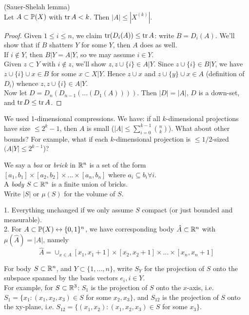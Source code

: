 \documentclass[a4paper]{article}
\begin{document}
\begin{thm} (Sauer-Shelah lemma)\\
    Let $A \subset \P(X)$ with $\tr A < k$. Then $|A| \leq |X^{(k)}|$.
    \begin{proof}
        Given $1 \leq i \leq n$, we claim $\tr(D_i(A)) \leq \tr A$: write $B=D_i(A)$. We'll show that if $B$ shatters $Y$ for some $Y$, then $A$ does as well.\\
        If $i \not\in Y$, then $B|Y = A|Y$, so we may assume $i \in Y$.\\
        Given $z \subset Y$ with $i \not\in z$, we'll show $z, z\cup\{i\} \in A|Y$. Since $z \cup \{i\} \in B|Y$, we have $z \cup \{i\} \cup x \in B$ for some $x \subset X|Y$. Hence $z \cup x$ and $z \cup \{y\} \cup x \in A$ (definition of $D_i$) whence $z,z\cup \{i\} \in A|Y$.\\
        Now let $D=D_n(D_{n-1}(...(D_1(A))))$. Then $|D|=|A|$, $D$ is a down-set, and $\tr D \leq \tr A$.
    \end{proof}
\end{thm}

\begin{rem}
    We used 1-dimensional compressions. We have: if all $k$-dimensional projections have size $\leq 2^k-1$, then $A$ is small ($|A| \leq \sum_{i=0}^{k-1} {n \choose k}$). What about other bounds? For example, what if each $k$-dimensional projection is $\leq 1/2$-sized $(A|Y| \leq 2^{k-1}$)?
\end{rem}

We say a \emph{box} or \emph{brick} in $\R^n$ is a set of the form $[a_1,b_1] \times [a_2,b_2] \times ... \times [a_n, b_n]$ where $a_i \subseteq b_i \forall i$.\\
A \emph{body} $S \subset \R^n$ is a finite union of bricks.\\
Write $|S|$ or $\mu(S)$ for the volume of $S$.

\begin{rem}
    1. Everything unchanged if we only assume $S$ compact (or just bounded and measurable).\\
    2. For $A \subset \P(X) \leftrightarrow \{0,1\}^n$, we have corresponding body $\hat{A} \subset \R^n$ with $\mu(\hat{A}) = |A|$, namely
    $$\hat{A} = \cup_{x \in A} [x_1,x_1+1] \times [x_2,x_2+1] \times ... \times [x_n,x_n+1]$$
\end{rem}

For body $S \subset \R^n$, and $Y \subset \{1,...,n\}$, write $S_Y$ for the projection of $S$ onto the subspace spanned by the basis vectors $e_i,i \in Y$.\\
For example, for $S \subset \R^3$: $S_1$ is the projection of $S$ onto the $x$-axis, i.e. $S_1 = \{x_1:(x_1,x_2,x_3) \in S$ for some $x_2,x_3\}$, and $S_{12}$ is the projection of $S$ onto the xy-plane, i.e. $S_{12} = \{(x_1,x_2):(x_1,x_2,x_3) \in S$ for some $x_3\}$.
\end{document}
